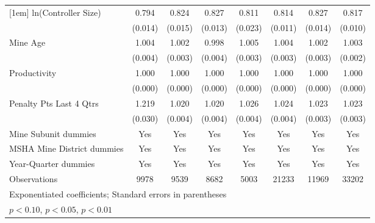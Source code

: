 {\begin{tabular}{l*{7}{c}}
[1em]
ln(Controller Size)      &       0.794\sym{***}&       0.824\sym{***}&       0.827\sym{***}&       0.811\sym{***}&       0.814\sym{***}&       0.827\sym{***}&       0.817\sym{***}\\
                         &     (0.014)         &     (0.015)         &     (0.013)         &     (0.023)         &     (0.011)         &     (0.014)         &     (0.010)         \\
[1em]
Mine Age                 &       1.004         &       1.002         &       0.998         &       1.005\sym{*}  &       1.004         &       1.002         &       1.003         \\
                         &     (0.004)         &     (0.003)         &     (0.004)         &     (0.003)         &     (0.003)         &     (0.003)         &     (0.002)         \\
[1em]
Productivity             &       1.000\sym{***}&       1.000\sym{***}&       1.000\sym{**} &       1.000\sym{***}&       1.000\sym{***}&       1.000\sym{***}&       1.000\sym{***}\\
                         &     (0.000)         &     (0.000)         &     (0.000)         &     (0.000)         &     (0.000)         &     (0.000)         &     (0.000)         \\
[1em]
Penalty Pts Last 4 Qtrs  &       1.219\sym{***}&       1.020\sym{***}&       1.020\sym{***}&       1.026\sym{***}&       1.024\sym{***}&       1.023\sym{***}&       1.023\sym{***}\\
                         &     (0.030)         &     (0.004)         &     (0.004)         &     (0.004)         &     (0.004)         &     (0.003)         &     (0.003)         \\
[1em]
Mine Subunit dummies     &         Yes         &         Yes         &         Yes         &         Yes         &         Yes         &         Yes         &         Yes         \\
[1em]
MSHA Mine District dummies&         Yes         &         Yes         &         Yes         &         Yes         &         Yes         &         Yes         &         Yes         \\
[1em]
Year-Quarter dummies     &         Yes         &         Yes         &         Yes         &         Yes         &         Yes         &         Yes         &         Yes         \\
\hline
Observations             &        9978         &        9539         &        8682         &        5003         &       21233         &       11969         &       33202         \\
\hline\hline
\multicolumn{8}{l}{\footnotesize Exponentiated coefficients; Standard errors in parentheses}\\
\multicolumn{8}{l}{\footnotesize \sym{*} \(p<0.10\), \sym{**} \(p<0.05\), \sym{***} \(p<0.01\)}\\
\end{tabular}
}
